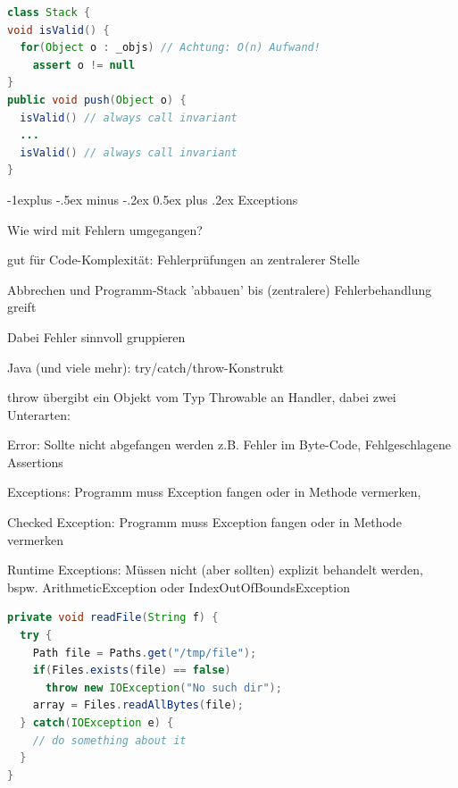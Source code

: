 \documentclass[10pt]{article}
\makeatletter
\renewcommand{\subsection}{\@startsection{subsection}{2}{0mm}%
                                {-1explus -.5ex minus -.2ex}%
                                {0.5ex plus .2ex}%
                                {\normalfont\normalsize\bfseries}}
\makeatother
\begin{document}
\begin{lstlisting}[language=java]
class Stack {
void isValid() {
  for(Object o : _objs) // Achtung: O(n) Aufwand!
    assert o != null
}
public void push(Object o) {
  isValid() // always call invariant
  ...
  isValid() // always call invariant
}
\end{lstlisting}

\subsection{Exceptions}
\begin{itemize*}
  \item Wie wird mit Fehlern umgegangen?
  \item gut für Code-Komplexität: Fehlerprüfungen an zentralerer Stelle
  \begin{itemize*}
    \item Abbrechen und Programm-Stack 'abbauen' bis (zentralere) Fehlerbehandlung greift
    \item Dabei Fehler sinnvoll gruppieren
  \end{itemize*}
  \item Java (und viele mehr): try/catch/throw-Konstrukt
  \begin{itemize*}
    \item throw übergibt ein Objekt vom Typ Throwable an Handler, dabei zwei Unterarten:
    \item Error: Sollte nicht abgefangen werden z.B. Fehler im Byte-Code, Fehlgeschlagene Assertions
    \item Exceptions: Programm muss Exception fangen oder in Methode vermerken,
    \begin{itemize*}
      \item Checked Exception: Programm muss Exception fangen oder in Methode vermerken
      \item Runtime Exceptions: Müssen nicht (aber sollten) explizit behandelt werden, bspw. ArithmeticException oder IndexOutOfBoundsException
    \end{itemize*}
  \end{itemize*}
\end{itemize*}

\begin{lstlisting}[language=java]
private void readFile(String f) {
  try {
    Path file = Paths.get("/tmp/file");
    if(Files.exists(file) == false)
      throw new IOException("No such dir");
    array = Files.readAllBytes(file);
  } catch(IOException e) {
    // do something about it
  }
}
\end{lstlisting}
\end{document}

